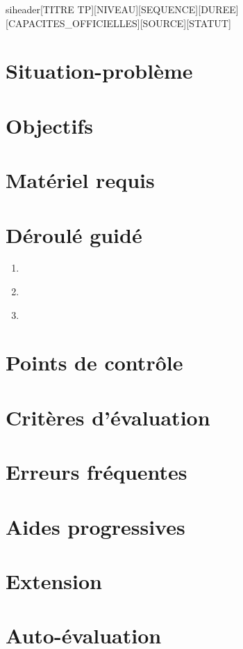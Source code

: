 \documentclass[a4paper,11pt]{article}
\begin{document}
siheader{[TITRE TP]}{[NIVEAU]}{[SEQUENCE]}{[DUREE]}{[CAPACITES\_OFFICIELLES]}{[SOURCE]}{[STATUT]}
\section*{Situation-problème}
\section*{Objectifs}
\section*{Matériel requis}
\section*{Déroulé guidé}
\begin{enumerate}[nosep]
  \item ~
  \item ~
  \item ~
\end{enumerate}
\section*{Points de contrôle}
\section*{Critères d'évaluation}
\section*{Erreurs fréquentes}
\section*{Aides progressives}
\section*{Extension}
\section*{Auto-évaluation}
\end{document}
